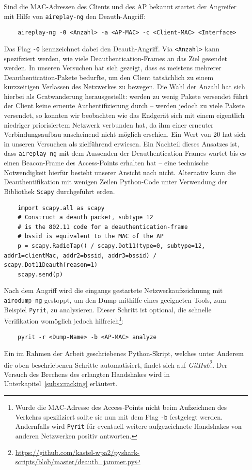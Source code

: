 Sind die MAC-Adressen des Clients und des AP bekannt startet der Angreifer mit Hilfe von \texttt{aireplay-ng} den Deauth-Angriff: 
\begin{Verbatim}
	aireplay-ng -0 <Anzahl> -a <AP-MAC> -c <Client-MAC> <Interface>
\end{Verbatim}
Das Flag \texttt{-0} kennzeichnet dabei den Deauth-Angriff.
Via \texttt{<Anzahl>} kann spezifiziert werden, wie viele Deauthentication-Frames an das Ziel gesendet werden.
In unseren Versuchen hat sich gezeigt, dass es meistens mehrerer Deauthentication-Pakete bedurfte, um den Client tatsächlich zu einem kurzzeitigen Verlassen des Netzwerkes zu bewegen. Die Wahl der Anzahl hat sich hierbei als Gratwanderung herausgestellt: werden zu wenig Pakete versendet führt der Client keine erneute Authentifizierung durch -- werden jedoch zu viele Pakete versendet, so konnten wir beobachten wie das Endgerät sich mit einem eigentlich niedriger priorisiertem Netzwerk verbunden hat, da ihm einer erneuter Verbindungsaufbau anscheinend nicht möglich erschien. Ein Wert von 20 hat sich in unseren Versuchen als zielführend erwiesen.
Ein Nachteil dieses Ansatzes ist, dass \texttt{aireplay-ng} mit dem Aussenden der Deauthentication-Frames wartet bis es einen Beacon-Frame des Access-Points erhalten hat -- eine technische Notwendigkeit hierfür besteht unserer Ansicht nach nicht.
Alternativ kann die Deauthentifikation mit wenigen Zeilen Python-Code unter Verwendung der Bibliothek \texttt{Scapy} durchgeführt erden.

\begin{verbatim}
	import scapy.all as scapy
	# Construct a deauth packet, subtype 12 
	# is the 802.11 code for a deauthentication-frame
	# bssid is equivalent to the MAC of the AP
	p = scapy.RadioTap() / scapy.Dot11(type=0, subtype=12, addr1=clientMac, addr2=bssid, addr3=bssid) / scapy.Dot11Deauth(reason=1)
	scapy.send(p)
\end{verbatim}

Nach dem Angriff wird die eingangs gestartete Netzwerkaufzeichnung mit \texttt{airodump-ng} gestoppt, um den Dump mithilfe eines geeigneten Tools, zum Beispiel \texttt{Pyrit}, zu analysieren. Dieser Schritt ist optional, die schnelle Verifikation womöglich jedoch hilfreich\footnote{Wurde die MAC-Adresse des Access-Points nicht beim Aufzeichnen des Verkehrs spezifiziert sollte sie nun mit dem Flag \texttt{-b} festgelegt werden.
Andernfalls wird \texttt{Pyrit} für eventuell weitere aufgezeichnete Handshakes von anderen Netzwerken positiv antworten.}: 
\begin{Verbatim}
	pyrit -r <Dump-Name> -b <AP-MAC> analyze
\end{Verbatim}
Ein im Rahmen der Arbeit geschriebenes Python-Skript, welches unter Anderem die oben beschriebenen Schritte automatisiert, findet sich auf \textit{GitHub}\footnote{\href{https://github.com/kastel-wpa2/pyshark-scripts/blob/master/deauth_jammer.py}{https://github.com/kastel-wpa2/pyshark-scripts/blob/master/deauth\_jammer.py}}.
Der Versuch des Brechens des erlangten Handshakes wird in Unterkapitel~\ref{subs:cracking} erläutert.

